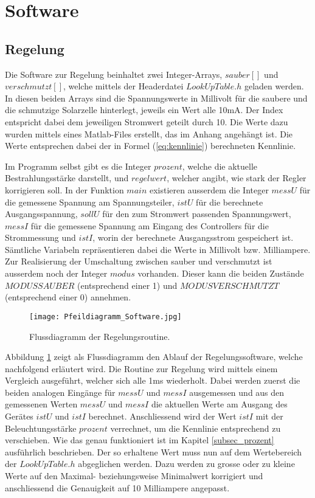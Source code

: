 \section{Software}

\subsection{Regelung}
Die Software zur Regelung beinhaltet zwei Integer-Arrays, $sauber[]$ und $verschmutzt[]$, welche mittels der Headerdatei $LookUpTable.h$ geladen werden. In diesen beiden Arrays sind die Spannungswerte in Millivolt für die saubere und die schmutzige Solarzelle hinterlegt, jeweils ein Wert alle 10mA. Der Index entspricht dabei dem jeweiligen Stromwert geteilt durch 10. \newline
Die Werte dazu wurden mittels eines Matlab-Files erstellt, das im Anhang angehängt ist. Die Werte entsprechen dabei der in Formel (\ref{eq:kennlinie}) berechneten Kennlinie.

Im Programm selbst gibt es die Integer $prozent$, welche die aktuelle Bestrahlungsstärke darstellt, und $regelwert$, welcher angibt, wie stark der Regler korrigieren soll. \newline
In der Funktion $main$ existieren ausserdem die Integer $messU$ für die gemessene Spannung am Spannungsteiler, $istU$ für die berechnete Ausgangsspannung, $sollU$ für den zum Stromwert passenden Spannungswert, $messI$ für die gemessene Spannung am Eingang des Controllers für die Strommessung und $istI$, worin der berechnete Ausgangsstrom gespeichert ist. Sämtliche Variabeln repräsentieren dabei die Werte in Millivolt bzw. Milliampere. \newline
Zur Realisierung der Umschaltung zwischen sauber und verschmutzt ist ausserdem noch der Integer $modus$ vorhanden. Dieser kann die beiden Zustände $MODUSSAUBER$ (entsprechend einer 1) und $MODUSVERSCHMUTZT$ (entsprechend einer 0) annehmen.

\begin{figure}[h]
	\centering
		\texttt{[image: Pfeildiagramm\_Software.jpg]}
	\caption{Flussdiagramm der Regelungsroutine.}
	\label{fig:Pfeildiagramm_Software}
\end{figure}

Abbildung \ref{fig:Pfeildiagramm_Software} zeigt als Flussdiagramm den Ablauf der Regelungssoftware, welche nachfolgend erläutert wird. Die Routine zur Regelung wird mittels einem Vergleich ausgeführt, welcher sich alle 1ms wiederholt. Dabei werden zuerst die beiden analogen Eingänge für $messU$ und $messI$ ausgemessen und aus den gemessenen Werten $messU$ und $messI$ die aktuellen Werte am Ausgang des Gerätes $istU$ und $istI$ berechnet. \newline
Anschliessend wird der Wert $istI$ mit der Beleuchtungsstärke $prozent$ verrechnet, um die Kennlinie entsprechend zu verschieben. Wie das genau funktioniert ist im Kapitel \ref{subsec_prozent} ausführlich beschrieben. \newline
Der so erhaltene Wert muss nun auf dem Wertebereich der $LookUpTable.h$ abgeglichen werden. Dazu werden zu grosse oder zu kleine Werte auf den Maximal- beziehungsweise Minimalwert korrigiert und anschliessend die Genauigkeit auf 10 Milliampere angepasst.

